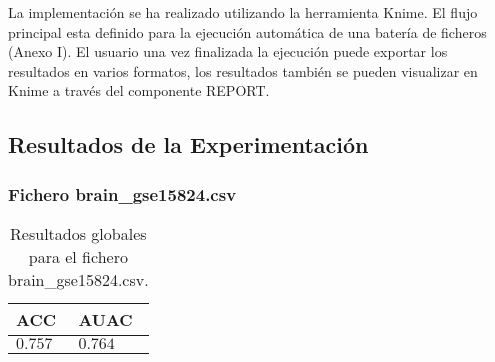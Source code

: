 \bigbreak

La implementación se ha realizado utilizando la herramienta Knime. El flujo principal esta definido para la ejecución automática de una batería de ficheros (Anexo I). El usuario una vez finalizada la ejecución puede exportar los resultados en varios formatos, los resultados también se pueden visualizar en Knime a través del componente REPORT.

\clearpage

\subsection{Resultados de la Experimentación}

\subsubsection{Fichero brain\_gse15824.csv}

\begin{table}[htp]
    \small
    \centering
    \begin{tabularx}{\columnwidth}{Y Y}
        ACC       & AUAC    \\\hline
        $0.757$   & $0.764$ \\\hline
    \end{tabularx}
    \caption{Resultados globales para el fichero brain\_gse15824.csv.}
    \label{tab:10}
\end{table}

